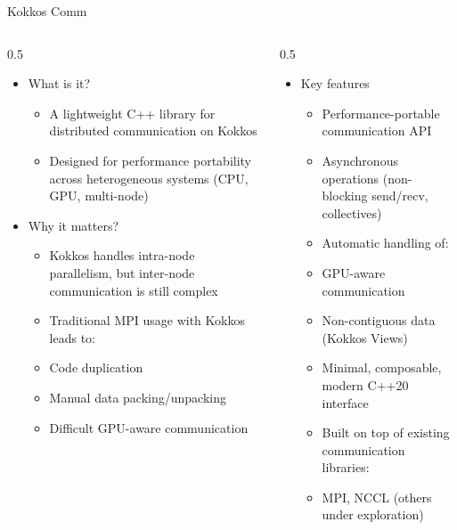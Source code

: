 \documentclass[
    aspectratio=169,
]{beamer}
\begin{document}
\begin{frame}{Kokkos Comm}
    \begin{columns}
        \begin{column}{0.5\linewidth}
            \begin{itemize}
                \item What is it?
                \begin{itemize}
                    \item A lightweight C++ library for distributed communication on Kokkos
                    \item Designed for performance portability across heterogeneous systems (CPU, GPU, multi-node)
                \end{itemize}
                \item Why it matters?
                \begin{itemize}
                    \item Kokkos handles intra-node parallelism, but inter-node communication is still complex
                    \item Traditional MPI usage with Kokkos leads to:
                    \item Code duplication
                    \item Manual data packing/unpacking
                    \item Difficult GPU-aware communication
                \end{itemize}
            \end{itemize}
        \end{column}
        \begin{column}{0.5\linewidth}
            \begin{itemize}
                \item Key features
                \begin{itemize}
                    \item Performance-portable communication API
                    \item Asynchronous operations (non-blocking send/recv, collectives)
                    \item Automatic handling of:
                    \item GPU-aware communication
                    \item Non-contiguous data (Kokkos Views)
                    \item Minimal, composable, modern C++20 interface
                    \item Built on top of existing 	communication libraries:
                    \item MPI, NCCL (others under exploration)
                \end{itemize}
            \end{itemize}
        \end{column}
    \end{columns}
\end{frame}
\end{document}
